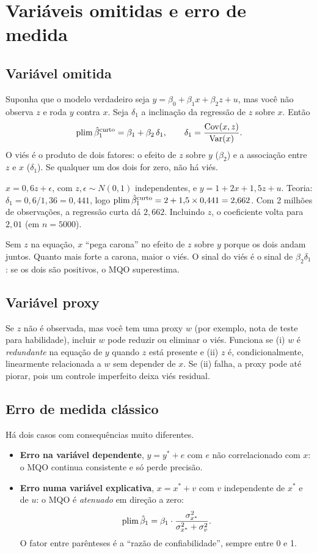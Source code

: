 \chapter{Variáveis omitidas e erro de medida}
\label{cap:omit}

\section{Variável omitida}
Suponha que o modelo verdadeiro seja $y=\beta_0+\beta_1x+\beta_2z+u$, mas você não observa $z$ e roda $y$ contra $x$. Seja $\delta_1$ a inclinação da regressão de $z$ sobre $x$. Então
\[
\operatorname{plim}\hat\beta_1^{\text{curto}}=\beta_1+\beta_2\,\delta_1,\qquad \delta_1=\frac{\operatorname{Cov}(x,z)}{\operatorname{Var}(x)}.
\]
O viés é o produto de dois fatores: o efeito de $z$ sobre $y$ ($\beta_2$) e a associação entre $z$ e $x$ ($\delta_1$). Se qualquer um dos dois for zero, não há viés.

\begin{simulacao}
$x=0{,}6z+\epsilon$, com $z,\epsilon\sim N(0,1)$ independentes, e $y=1+2x+1{,}5z+u$. Teoria: $\delta_1=0{,}6/1{,}36=0{,}441$, logo $\operatorname{plim}\hat\beta_1^{\text{curto}}=2+1{,}5\times0{,}441=2{,}662$. Com 2 milhões de observações, a regressão curta dá $2{,}662$. Incluindo $z$, o coeficiente volta para $2{,}01$ (em $n=5000$).
\end{simulacao}

\begin{intuicao}
Sem $z$ na equação, $x$ ``pega carona'' no efeito de $z$ sobre $y$ porque os dois andam juntos. Quanto mais forte a carona, maior o viés. O sinal do viés é o sinal de $\beta_2\delta_1$: se os dois são positivos, o MQO superestima.
\end{intuicao}

\section{Variável proxy}
Se $z$ não é observada, mas você tem uma proxy $w$ (por exemplo, nota de teste para habilidade), incluir $w$ pode reduzir ou eliminar o viés. Funciona se (i) $w$ é \emph{redundante} na equação de $y$ quando $z$ está presente e (ii) $z$ é, condicionalmente, linearmente relacionada a $w$ sem depender de $x$. Se (ii) falha, a proxy pode até piorar, pois um controle imperfeito deixa viés residual.

\section{Erro de medida clássico}
Há dois casos com consequências muito diferentes.
\begin{itemize}[leftmargin=1.4em]
\item \textbf{Erro na variável dependente}, $y=y^*+e$ com $e$ não correlacionado com $x$: o MQO continua consistente e só perde precisão.
\item \textbf{Erro numa variável explicativa}, $x=x^*+v$ com $v$ independente de $x^*$ e de $u$: o MQO é \emph{atenuado} em direção a zero:
\[
\operatorname{plim}\hat\beta_1=\beta_1\cdot\frac{\sigma^2_{x^*}}{\sigma^2_{x^*}+\sigma^2_v}.
\]
O fator entre parênteses é a ``razão de confiabilidade'', sempre entre 0 e 1.
\end{itemize}


